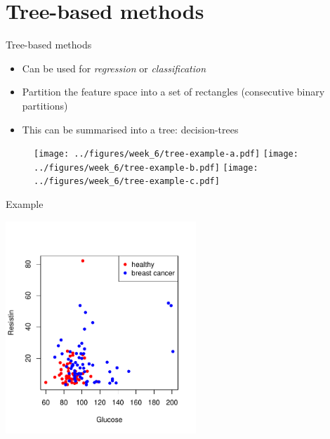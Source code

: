 \documentclass[notes]{beamer}          %
\begin{document}
\section{Tree-based methods}
\begin{frame}{Tree-based methods}
\begin{itemize}
 \item Can be used for \textit{regression} or \textit{classification}
 \item Partition the feature space into a set of rectangles (consecutive binary partitions)
 \item This can be summarised into a tree: decision-trees
 \end{itemize}
 
 \begin{figure}
  \texttt{[image: ../figures/week\_6/tree-example-a.pdf]}  
\endminipage\hfill
{}
  \texttt{[image: ../figures/week\_6/tree-example-b.pdf]}  
\endminipage\hfill
{}%
  \texttt{[image: ../figures/week\_6/tree-example-c.pdf]}  
\endminipage
\end{figure}

\end{frame}



\begin{frame}{Example}
\begin{center}
\includegraphics[height=8cm]{../figures/week_6/breast_cancer_2Dscatterplot.pdf}  
\end{center}
\end{frame}
\end{document}
